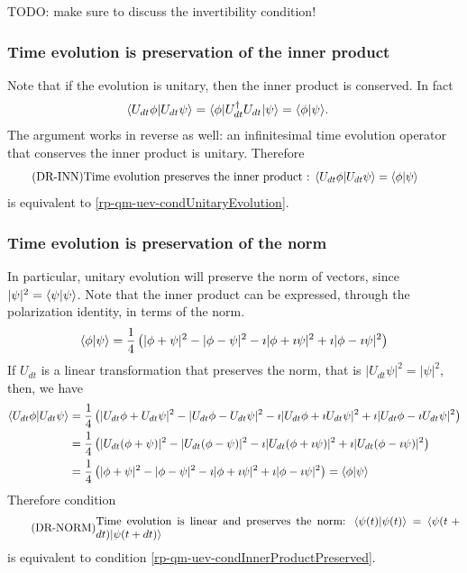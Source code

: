 TODO: make sure to discuss the invertibility condition!

\subsubsection{Time evolution is preservation of the inner product}
Note that if the evolution is unitary, then the inner product is conserved. In fact
\begin{equation}
	\begin{aligned}
		\langle U_{dt} \phi | U_{dt} \psi\rangle &= \langle \phi | U^\dagger_{dt} U_{dt} | \psi \rangle =\langle  \phi | \psi \rangle.
	\end{aligned}
\end{equation}
The argument works in reverse as well: an infinitesimal time evolution operator that conserves the inner product is unitary. Therefore
\begin{equation}\label{rp-qm-uev-condInnerProductPreserved}
	\tag{DR-INN}
	\eqtext{Time evolution preserves the inner product : $\< U_{dt} \phi | U_{dt} \psi\> =\<  \phi | \psi \>$} 
\end{equation}
is equivalent to \ref{rp-qm-uev-condUnitaryEvolution}.

\subsubsection{Time evolution is preservation of the norm}
In particular, unitary evolution will preserve the norm of vectors, since $|\psi|^2 = \langle\psi | \psi \rangle$. Note that the inner product can be expressed, through the polarization identity, in terms of the norm.
\begin{equation}
	\begin{aligned}
		\langle \phi | \psi \rangle = \frac{1}{4}\left( |\phi + \psi|^2 - |\phi - \psi|^2 - \imath |\phi + \imath \psi|^2 +\imath |\phi - \imath \psi|^2 \right)
	\end{aligned}
\end{equation}
If $U_{dt}$ is a linear transformation that preserves the norm, that is $|U_{dt} \psi | ^2 = | \psi |^2$, then, we have
\begin{equation}
	\begin{aligned}
		\langle U_{dt} \phi | U_{dt} \psi \rangle &= \frac{1}{4}\left( |U_{dt}\phi + U_{dt}\psi|^2 - |U_{dt}\phi - U_{dt}\psi|^2 - \imath |U_{dt}\phi + \imath U_{dt}\psi|^2 +\imath |U_{dt}\phi - \imath U_{dt}\psi|^2 \right) \\
		&= \frac{1}{4}\left( |U_{dt}(\phi + \psi)|^2 - |U_{dt}(\phi - \psi)|^2 - \imath |U_{dt}(\phi + \imath \psi)|^2 +\imath |U_{dt}(\phi - \imath \psi)|^2 \right) \\
		&= \frac{1}{4}\left( |\phi + \psi|^2 - |\phi - \psi|^2 - \imath |\phi + \imath \psi|^2 +\imath |\phi - \imath \psi|^2 \right) =  \langle \phi | \psi \rangle 
	\end{aligned}
\end{equation}
Therefore condition
\begin{equation}\label{rp-qm-uev-condNormalized}
	\tag{DR-NORM}
	\eqtext{Time evolution is linear and preserves the norm: $\< \psi(t) | \psi(t) \> = \< \psi(t+dt) | \psi(t+dt) \>$} 
\end{equation}
is equivalent to condition \ref{rp-qm-uev-condInnerProductPreserved}.

